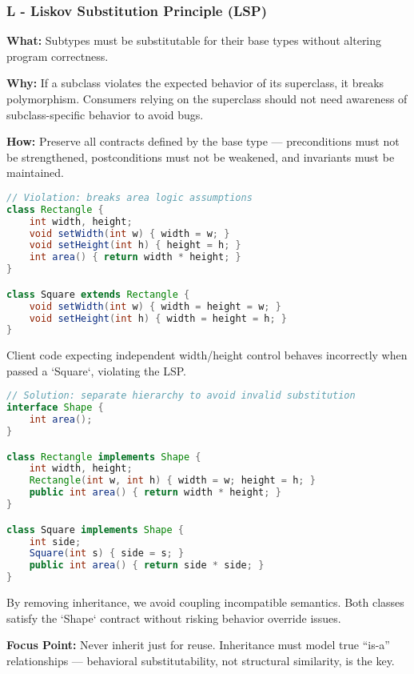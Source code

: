 \documentclass[a4paper,12pt]{article}
\begin{document}
\subsubsection{L - Liskov Substitution Principle (LSP)}

\textbf{What:} Subtypes must be substitutable for their base types without altering program correctness.

\textbf{Why:} If a subclass violates the expected behavior of its superclass, it breaks polymorphism. Consumers relying on the superclass should not need awareness of subclass-specific behavior to avoid bugs.

\textbf{How:} Preserve all contracts defined by the base type — preconditions must not be strengthened, postconditions must not be weakened, and invariants must be maintained.

\begin{lstlisting}[language=Java]
// Violation: breaks area logic assumptions
class Rectangle {
    int width, height;
    void setWidth(int w) { width = w; }
    void setHeight(int h) { height = h; }
    int area() { return width * height; }
}

class Square extends Rectangle {
    void setWidth(int w) { width = height = w; }
    void setHeight(int h) { width = height = h; }
}
\end{lstlisting}

Client code expecting independent width/height control behaves incorrectly when passed a `Square`, violating the LSP.

\begin{lstlisting}[language=Java]
// Solution: separate hierarchy to avoid invalid substitution
interface Shape {
    int area();
}

class Rectangle implements Shape {
    int width, height;
    Rectangle(int w, int h) { width = w; height = h; }
    public int area() { return width * height; }
}

class Square implements Shape {
    int side;
    Square(int s) { side = s; }
    public int area() { return side * side; }
}
\end{lstlisting}

By removing inheritance, we avoid coupling incompatible semantics. Both classes satisfy the `Shape` contract without risking behavior override issues.

\textbf{Focus Point:} Never inherit just for reuse. Inheritance must model true “is-a” relationships — behavioral substitutability, not structural similarity, is the key.
\end{document}
